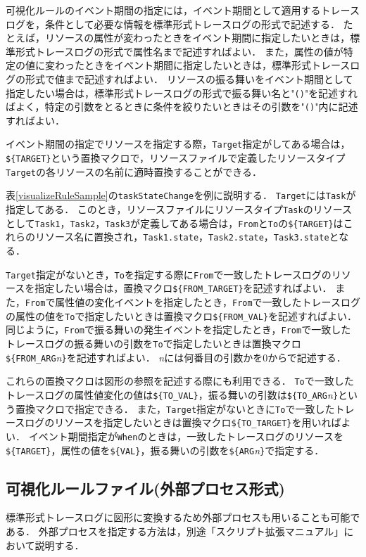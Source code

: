 \begin{description}
{\begin{description}
    \end{description}
}
\end{description}

可視化ルールのイベント期間の指定には，イベント期間として適用するトレースログを，条件として必要な情報を標準形式トレースログの形式で記述する．
たとえば，リソースの属性が変わったときをイベント期間に指定したいときは，標準形式トレースログの形式で属性名まで記述すればよい．
また，属性の値が特定の値に変わったときをイベント期間に指定したいときは，標準形式トレースログの形式で値まで記述すればよい．
リソースの振る舞いをイベント期間として指定したい場合は，標準形式トレースログの形式で振る舞い名と"{\tt ()}"を記述すればよく，特定の引数をとるときに条件を絞りたいときはその引数を"{\tt ()}"内に記述すればよい．

イベント期間の指定でリソースを指定する際，{\tt Target}指定がしてある場合は，\verb|${TARGET}|という置換マクロで，リソースファイルで定義したリソースタイプ{\tt Target}の各リソースの名前に適時置換することができる．

表\ref{visualizeRuleSample}の{\tt taskStateChange}を例に説明する．
{\tt Target}には{\tt Task}が指定してある．
このとき，リソースファイルにリソースタイプ{\tt Task}のリソースとして{\tt Task1}，{\tt Task2}，{\tt Task3}が定義してある場合は，{\tt From}と{\tt To}の\verb|${TARGET}|はこれらのリソース名に置換され，{\tt Task1.state}，{\tt Task2.state}，{\tt Task3.state}となる．

{\tt Target}指定がないとき，{\tt To}を指定する際に{\tt From}で一致したトレースログのリソースを指定したい場合は，置換マクロ\verb|${FROM_TARGET}|を記述すればよい．
また，{\tt From}で属性値の変化イベントを指定したとき，{\tt From}で一致したトレースログの属性の値を{\tt To}で指定したいときは置換マクロ\verb|${FROM_VAL}|を記述すればよい．
同じように，{\tt From}で振る舞いの発生イベントを指定したとき，{\tt From}で一致したトレースログの振る舞いの引数を{\tt To}で指定したいときは置換マクロ\verb|${FROM_ARG|{\it n}\verb|}|を記述すればよい．
{\it n}には何番目の引数かを0からで記述する．

これらの置換マクロは図形の参照を記述する際にも利用できる．
{\tt To}で一致したトレースログの属性値変化の値は\verb|${TO_VAL}|，振る舞いの引数は\verb|${TO_ARG|{\it n}\verb|}|という置換マクロで指定できる．
また，{\tt Target}指定がないときに{\tt To}で一致したトレースログのリソースを指定したいときは置換マクロ\verb|${TO_TARGET}|を用いればよい．
イベント期間指定が{\tt When}のときは，一致したトレースログのリソースを\verb|${TARGET}|，属性の値を\verb|${VAL}|，振る舞いの引数を\verb|${ARG|{\it n}\verb|}|で指定する．

\subsection{可視化ルールファイル(外部プロセス形式)}
標準形式トレースログに図形に変換するため外部プロセスも用いることも可能である．
外部プロセスを指定する方法は，別途「スクリプト拡張マニュアル」において説明する．